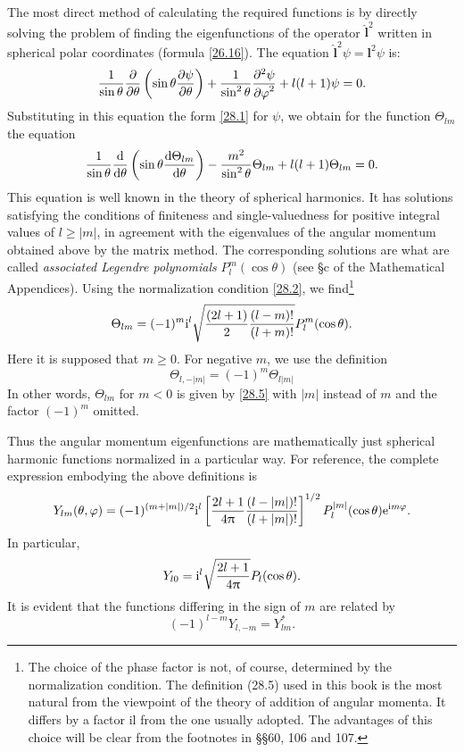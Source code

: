 The most direct method of calculating the required functions is by directly solving the problem of finding the eigenfunctions of the operator $\hat{\bm{l}}^2$ written in spherical polar coordinates (formula \eqref{26.16}). The equation $ \hat{\bm{l}}^2\psi=\bm{l}^2\psi $ is:
\[ \frac{1}{\sin\theta}\frac{\partial}{\partial\theta}\left(\sin\theta\frac{\partial\psi}{\partial\theta} \right)+\frac{1}{\sin^2\theta}\frac{\partial^2\psi}{{\partial\varphi}^2}+l(l+1)\psi=0. \]
Substituting in this equation the form \eqref{28.1} for $\psi$, we obtain for the function $\Theta_{lm}$ the equation
\begin{equation}\label{28.4}
\frac{1}{\sin\theta}\frac{\mathrm{d}}{\mathrm{d}\theta}\left(\sin\theta\frac{\mathrm{d}\Theta_{lm}}{\mathrm{d}\theta} \right)-\frac{m^2}{\sin^2\theta}\Theta_{lm}+l(l+1)\Theta_{lm}=0.
\end{equation}
This equation is well known in the theory of spherical harmonics. It has solutions satisfying the conditions of finiteness and single-valuedness for positive integral values of $ l \geqslant |m| $, in agreement with the eigenvalues of the angular momentum obtained above by the matrix method. The corresponding solutions are what are called \textit{associated Legendre polynomials} $ P_l^m(\cos\theta) $ (see \S c of the Mathematical Appendices). Using the normalization condition \eqref{28.2}, we find\footnote{The choice of the phase factor is not, of course, determined by the normalization condition. The definition (28.5) used in this book is the most natural from the viewpoint of the theory of addition of angular momenta. It differs by a factor il from the one usually adopted. The advantages of this choice will be clear from the footnotes in \S\S60, 106 and 107.}
\begin{equation}\label{28.5}
\Theta_{lm}=(-1)^m\mathrm{i}^l\sqrt{\frac{(2l+1)}{2}\frac{(l-m)!}{(l+m)!}}P_l^m(\cos\theta).
\end{equation}
Here it is supposed that $ m \geqslant0 $. For negative $ m $, we use the definition
\begin{equation}\label{28.6}
\Theta_{l,-|m|}=(-1)^m\Theta_{l|m|}
\end{equation}
In other words, $\Theta_{lm}$ for $ m < 0 $ is given by \eqref{28.5} with $ |m| $ instead of $ m $ and the factor $ (-1)^m $ omitted.

Thus the angular momentum eigenfunctions are mathematically just spherical harmonic functions normalized in a particular way. For reference, the complete expression embodying the above definitions is
\begin{equation}\label{28.7}
Y_{lm}(\theta,\varphi)=(-1)^{(m+|m|)/2}\mathrm{i}^l\left[\frac{2l+1}{4\uppi}\frac{(l-|m|)!}{(l+|m|)!} \right]^{1/2}P_l^{|m|}(\cos\theta)\mathrm{e}^{\mathrm{i} m\varphi}.
\end{equation}
In particular,
\begin{equation}\label{28.8}
Y_{l0}=\mathrm{i}^l\sqrt{\frac{2l+1}{4\uppi}}P_l(\cos\theta).
\end{equation}
It is evident that the functions differing in the sign of $ m $ are related by
\begin{equation}\label{28.9}
(-1)^{l-m}Y_{l,-m}=Y_{lm}^*.
\end{equation}


